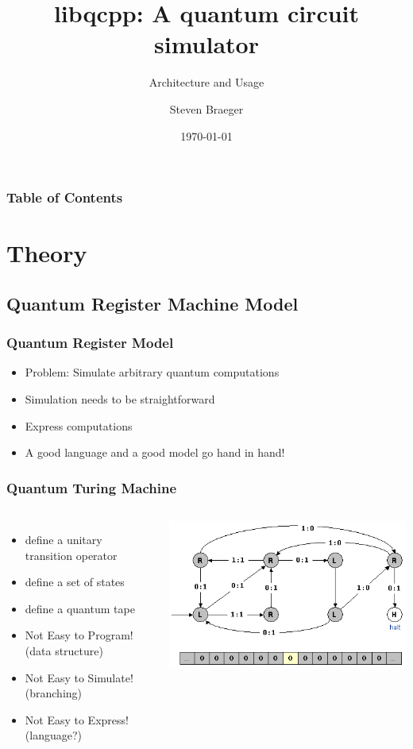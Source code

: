 \documentclass{beamer}
\title
{libqcpp: A quantum circuit simulator}
\subtitle{Architecture and Usage}
\author
{Steven Braeger}
\date{\today}
\begin{document}
\frame{\titlepage} 


\begin{frame}
\frametitle{Table of Contents}
\tableofcontents
\end{frame}

\section{Theory}
\subsection{Quantum Register Machine Model}

\begin{frame}
  \frametitle{Quantum Register Model}
   \begin{itemize}
    \item Problem:  Simulate arbitrary quantum computations
    \item Simulation needs to be straightforward
    \item Express computations
    \item A good language and a good model go hand in hand!
   \end{itemize}
\end{frame}

\begin{frame}
   \frametitle{Quantum Turing Machine}

\begin{columns}[c]
\column{2.5in}
   \begin{itemize}
    \item define a unitary transition operator
    \item define a set of states
    \item define a quantum tape
    \item Not Easy to Program! (data structure)
    \item Not Easy to Simulate!(branching)
    \item Not Easy to Express! (language?)
   \end{itemize}
\column{2in}
\includegraphics[width=\textwidth]{./beaverTM.png}
\end{columns}

\end{frame}
\end{document}
